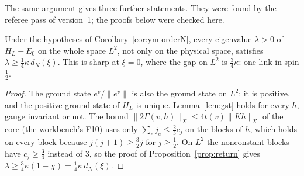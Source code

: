The same argument gives three further statements. They were found by the referee pass of version~1; the proofs below were checked here.

\begin{corollary}\label{cor:fullspace}
Under the hypotheses of Corollary~\ref{cor:ym-orderN}, every eigenvalue $\lambda>0$ of $H_L-E_0$ on the whole space $L^2$, not only on the physical space, satisfies $\lambda\ge\frac14\kappa\,d_N(\xi)$. This is sharp at $\xi=0$, where the gap on $L^2$ is $\frac34\kappa$: one link in spin $\frac12$.
\end{corollary}
\begin{proof}
The ground state $e^v/\|e^v\|$ is also the ground state on $L^2$: it is positive, and the positive ground state of $H_L$ is unique. Lemma~\ref{lem:gst} holds for every $h$, gauge invariant or not. The bound $\|2\Gamma(v,h)\|_X\le4t(v)\|Kh\|_X$ of the core (the workbench's F10) uses only $\sum_ej_e\le\frac23c_j$ on the blocks of $h$, which holds on every block because $j(j+1)\ge\frac32j$ for $j\ge\frac12$. On $L^2$ the nonconstant blocks have $c_j\ge\frac34$ instead of $3$, so the proof of Proposition~\ref{prop:return} gives $\lambda\ge\frac34\kappa(1-\chi)=\frac14\kappa\,d_N(\xi)$.
\end{proof}

